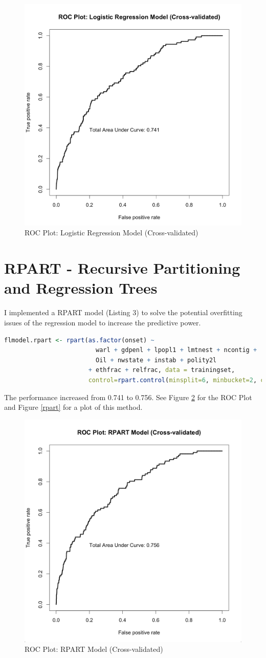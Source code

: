 \documentclass{article}
\begin{document}
\begin{figure}[h!]
    \centering
    \includegraphics[width=0.5\linewidth]{roclr.png}
    \caption{ROC Plot: Logistic Regression Model (Cross-validated)}
    \label{roclr}
\end{figure}


\section{RPART - Recursive Partitioning and Regression Trees}
I implemented a RPART model (Listing 3) to solve the potential overfitting issues of the regression model to increase the predictive power. 

\begin{lstlisting}[language=R, caption=RPART Model (Cross-Validated)]
flmodel.rpart <- rpart(as.factor(onset) ~ 
                         warl + gdpenl + lpopl1 + lmtnest + ncontig + 
                         Oil + nwstate + instab + polity2l
                       + ethfrac + relfrac, data = trainingset, 
                       control=rpart.control(minsplit=6, minbucket=2, cp=0.003)) #loosing the control for better predictive power
\end{lstlisting}

The performance increased from 0.741 to 0.756. See Figure \ref{rocrpart} for the ROC Plot and Figure \ref{rpart} for a plot of this method.

\begin{figure}[h!]
    \centering
    \includegraphics[width=0.5\linewidth]{rocrpart.png}
    \caption{ROC Plot: RPART Model (Cross-validated)}
    \label{rocrpart}
\end{figure}
\end{document}
